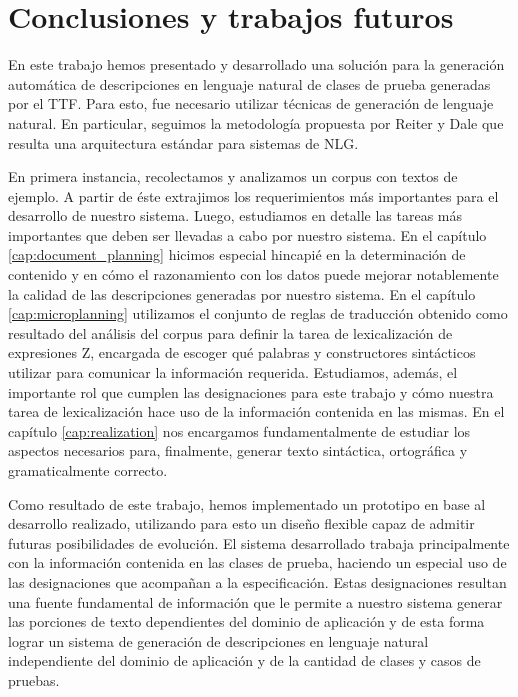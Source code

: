 \chapter{Conclusiones y trabajos futuros}
\label{cap:conclusion}

En este trabajo hemos presentado y desarrollado una solución para la generación automática de descripciones en lenguaje natural de clases de prueba generadas por el TTF. Para esto, fue necesario utilizar técnicas de generación de lenguaje natural. En particular, seguimos la metodología propuesta por Reiter y Dale \cite{reiter_dale} que resulta una arquitectura estándar para sistemas de NLG.

En primera instancia, recolectamos y analizamos un corpus con textos de ejemplo. A partir de éste extrajimos los requerimientos más importantes para el desarrollo de nuestro sistema. Luego, estudiamos en detalle las tareas más importantes que deben ser llevadas a cabo por nuestro sistema. En el capítulo \ref{cap:document_planning} hicimos especial hincapié en la determinación de contenido y en cómo el razonamiento con los datos puede mejorar notablemente la calidad de las descripciones generadas por nuestro sistema. En el capítulo \ref{cap:microplanning} utilizamos el conjunto de reglas de traducción obtenido como resultado del análisis del corpus para definir la tarea de lexicalización de expresiones Z, encargada de escoger qué palabras y constructores sintácticos utilizar para comunicar la información requerida. Estudiamos, además, el importante rol que cumplen las designaciones para este trabajo y cómo nuestra tarea de lexicalización hace uso de la información contenida en las mismas. En el capítulo \ref{cap:realization} nos encargamos fundamentalmente de estudiar los aspectos necesarios para, finalmente, generar texto sintáctica, ortográfica y gramaticalmente correcto.

Como resultado de este trabajo, hemos implementado un prototipo en base al desarrollo realizado, utilizando para esto un diseño flexible capaz de admitir futuras posibilidades de evolución. El sistema desarrollado trabaja principalmente con la información contenida en las clases de prueba, haciendo un especial uso de las designaciones que acompañan a la especificación. Estas designaciones resultan una fuente fundamental de información que le permite a nuestro sistema generar las porciones de texto dependientes del dominio de aplicación y de esta forma lograr un sistema de generación de descripciones en lenguaje natural independiente del dominio de aplicación y de la cantidad de clases y casos de pruebas.

